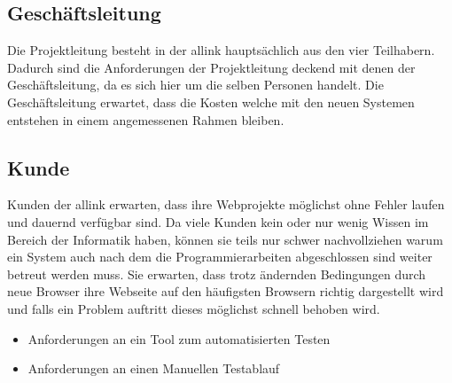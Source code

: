 \subsection{Geschäftsleitung}
\label{sub:geschäftsleitung}
Die Projektleitung besteht in der allink hauptsächlich aus den vier Teilhabern. Dadurch sind die Anforderungen der Projektleitung deckend mit denen der Geschäftsleitung, da es sich hier um die selben Personen handelt. Die Geschäftsleitung erwartet, dass die Kosten welche mit den neuen Systemen entstehen in einem angemessenen Rahmen bleiben.

\subsection{Kunde}
\label{sub:kunde}
Kunden der allink erwarten, dass ihre Webprojekte möglichst ohne Fehler laufen und dauernd verfügbar sind. Da viele Kunden kein oder nur wenig Wissen im Bereich der Informatik haben, können sie teils nur schwer nachvollziehen warum ein System auch nach dem die Programmierarbeiten abgeschlossen sind weiter betreut werden muss. Sie erwarten, dass trotz ändernden Bedingungen durch neue Browser ihre Webseite auf den häufigsten Browsern richtig dargestellt wird und falls ein Problem auftritt dieses möglichst schnell behoben wird.

\begin{itemize}
  \item Anforderungen an ein Tool zum automatisierten Testen
  \item Anforderungen an einen Manuellen Testablauf
\end{itemize}

